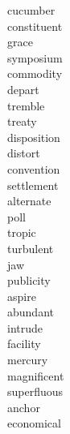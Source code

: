 \documentclass[b5paper, 11pt]{ctexart}
\begin{document}
\begin{multicols*}{3}
\begin{description}
\item[cucumber]

\item[constituent]

\item[grace]

\item[symposium]

\item[commodity]

\item[depart]

\item[tremble]

\item[treaty]

\item[disposition]

\item[distort]

\item[convention]

\item[settlement]

\item[alternate]

\item[poll]

\item[tropic]

\item[turbulent]

\item[jaw]

\item[publicity]

\item[aspire]

\item[abundant]

\item[intrude]

\item[facility]

\item[mercury]

\item[magnificent]

\item[superfluous]

\item[anchor]

\item[economical]


\end{description}
\end{multicols*}
\end{document}
